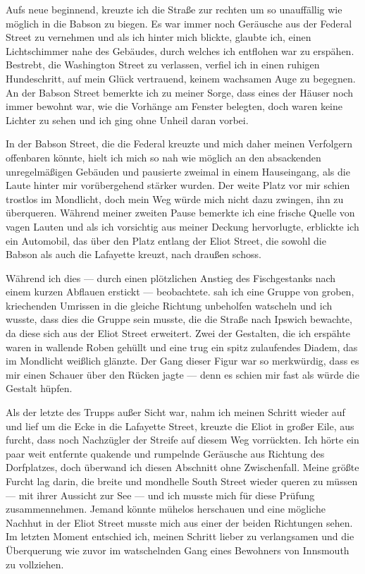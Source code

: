 Aufs neue beginnend, kreuzte ich die Straße zur rechten um so unauffällig wie möglich in die Babson zu biegen. Es war immer noch Geräusche aus der Federal Street zu vernehmen und als ich hinter mich blickte, glaubte ich, einen Lichtschimmer nahe des Gebäudes, durch welches ich entflohen war zu erspähen. Bestrebt, die Washington Street zu verlassen, verfiel ich in einen ruhigen Hundeschritt, auf mein Glück vertrauend, keinem wachsamen Auge zu begegnen. An der Babson Street bemerkte ich zu meiner Sorge, dass eines der Häuser noch immer bewohnt war, wie die Vorhänge am Fenster belegten, doch waren keine Lichter zu sehen und ich ging ohne Unheil daran vorbei.

In der Babson Street, die die Federal kreuzte und mich daher meinen Verfolgern offenbaren könnte, hielt ich mich so nah wie möglich an den absackenden unregelmäßigen Gebäuden und pausierte zweimal in einem Hauseingang, als die Laute hinter mir vorübergehend stärker wurden. Der weite Platz vor mir schien trostlos im Mondlicht, doch mein Weg würde mich nicht dazu zwingen, ihn zu überqueren. Während meiner zweiten Pause bemerkte ich eine frische Quelle von vagen Lauten und als ich vorsichtig aus meiner Deckung hervorlugte, erblickte ich ein Automobil, das über den Platz entlang der Eliot Street, die sowohl die Babson als auch die Lafayette kreuzt, nach draußen schoss.

Während ich dies --- durch einen plötzlichen Anstieg des Fischgestanks nach einem kurzen Abflauen erstickt --- beobachtete. sah ich eine Gruppe von groben, kriechenden Umrissen in die gleiche Richtung unbeholfen watscheln und ich wusste, dass dies die Gruppe sein musste, die die Straße nach Ipswich bewachte, da diese sich aus der Eliot Street erweitert. Zwei der Gestalten, die ich erspähte waren in wallende Roben gehüllt und eine trug ein spitz zulaufendes Diadem, das im Mondlicht weißlich glänzte. Der Gang dieser Figur war so merkwürdig, dass es mir einen Schauer über den Rücken jagte --- denn es schien mir fast als würde die Gestalt hüpfen.

Als der letzte des Trupps außer Sicht war, nahm ich meinen Schritt wieder auf und lief um die Ecke in die Lafayette Street, kreuzte die Eliot in großer Eile, aus furcht, dass noch Nachzügler der Streife auf diesem Weg vorrückten. Ich hörte ein paar weit entfernte quakende und rumpelnde Geräusche aus Richtung des Dorfplatzes, doch überwand ich diesen Abschnitt ohne Zwischenfall. Meine größte Furcht lag darin, die breite und mondhelle South Street wieder queren zu müssen --- mit ihrer Aussicht zur See --- und ich musste mich für diese Prüfung zusammennehmen. Jemand könnte mühelos herschauen und eine mögliche Nachhut in der Eliot Street musste mich aus einer der beiden Richtungen sehen. Im letzten Moment entschied ich, meinen Schritt lieber zu verlangsamen und die Überquerung wie zuvor im watschelnden Gang eines Bewohners von Innsmouth zu vollziehen.

